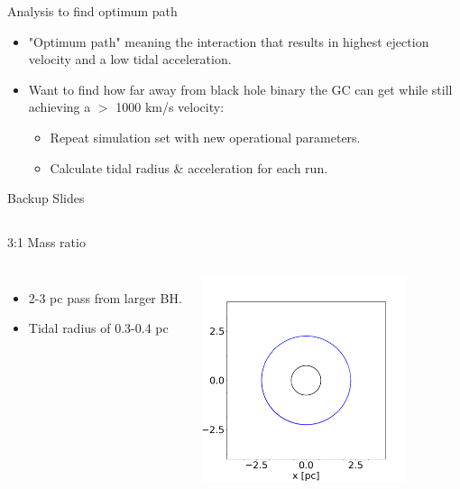 \documentclass[aspectratio=169]{beamer}
\begin{document}
\begin{frame}
  {Analysis to find optimum path}
  \begin{itemize}
    \item "Optimum path" meaning the interaction that results in highest ejection velocity and a low tidal acceleration.
    \item Want to find how far away from black hole binary the GC can get while still achieving a $>$ 1000 km/s velocity: 
    \begin{itemize}
      \item Repeat simulation set with new operational parameters. 
      \item Calculate tidal radius \& acceleration for each run.
    \end{itemize}
  \end{itemize}

\end{frame}

\backupbegin

\begin{frame}
  {}
  \begin{center}
    \Huge Backup Slides
  \end{center}
\end{frame}

\subsection{}
\begin{frame}
  {3:1 Mass ratio}
  \begin{columns}
    \begin{itemize}
      \item 2-3 pc pass from larger BH.
      \item Tidal radius of 0.3-0.4 pc
    \end{itemize}
    \includegraphics[width=6cm, height=6cm]{./Images/hvgc1_0333ratio.png}
    \centering
  \end{columns}
\end{frame}

\backupend
\end{document}
